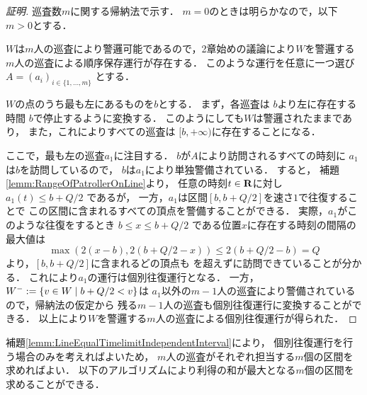 \begin{proof}[証明]

  \newcommand{\leftmostpoint}{b}  %
  \newcommand{\newpatroller}{l}
  \newcommand{\leftmostpatroller}{a_1}

  巡査数$m$に関する帰納法で示す．
  $m = 0$のときは明らかなので，以下$m > 0$とする．

  $W$は$m$人の巡査により警邏可能であるので，2章始めの議論により$W$を警邏する$m$人の巡査による順序保存運行が存在する．
  このような運行を任意に一つ選び
  $A = (a _i) _{i \in \{1, \ldots, m\}}$
  とする．

  $W$の点のうち最も左にあるものを$\leftmostpoint$とする．
  まず，各巡査は
  $\leftmostpoint$より左に存在する時間
  $\leftmostpoint$で停止するように変換する．
  このようにしても$W$は警邏されたままであり，
  また，これによりすべての巡査は
  $[\leftmostpoint, +\infty)$に存在することになる．

  ここで，最も左の巡査$\leftmostpatroller$に注目する．
  $\leftmostpoint$が$A$により訪問されるすべての時刻に
  $\leftmostpatroller$は$\leftmostpoint$を訪問しているので，
  $\leftmostpoint$は$\leftmostpatroller$により単独警備されている．
  すると，
  補題\ref{lemm:RangeOfPatrollerOnLine}より，
  任意の時刻$t \in \mathbf R$に対し
  $\leftmostpatroller(t) \leq \leftmostpoint + Q/2$
  であるが，
  一方，$\leftmostpatroller$は区間$[b, b + Q/2]$を速さ$1$で往復することで
  この区間に含まれるすべての頂点を警備することができる．
  実際，$\leftmostpatroller$がこのような往復をするとき
  $\leftmostpoint \leq x \leq \leftmostpoint + Q/2$
  である位置$x$に存在する時刻の間隔の最大値は
  \[
    \max( 2(x - \leftmostpoint), 2(\leftmostpoint + Q/2 - x) )
    \leq 2(\leftmostpoint + Q/2 - \leftmostpoint) = Q
  \]
  より，$[\leftmostpoint, \leftmostpoint + Q/2]$に含まれるどの頂点も
  {\idletime}を超えずに訪問できていることが分かる．
  これにより$\leftmostpatroller$の運行は個別往復運行となる．
  一方，$W^- := \mathsetmid{ v \in W }{ \leftmostpoint + Q/2 < v }$は
  $\leftmostpatroller$以外の$m - 1$人の巡査により警備されているので，帰納法の仮定から
  残る$m - 1$人の巡査も個別往復運行に変換することができる．
  以上により$W$を警邏する$m$人の巡査による個別往復運行が得られた．
\end{proof}


補題\ref{lemm:LineEqualTimelimitIndependentInterval}により，
個別往復運行を行う場合のみを考えればよいため，
$m$人の巡査がそれぞれ担当する$m$個の区間を求めればよい．
以下のアルゴリズムにより利得の和が最大となる$m$個の区間を求めることができる．

